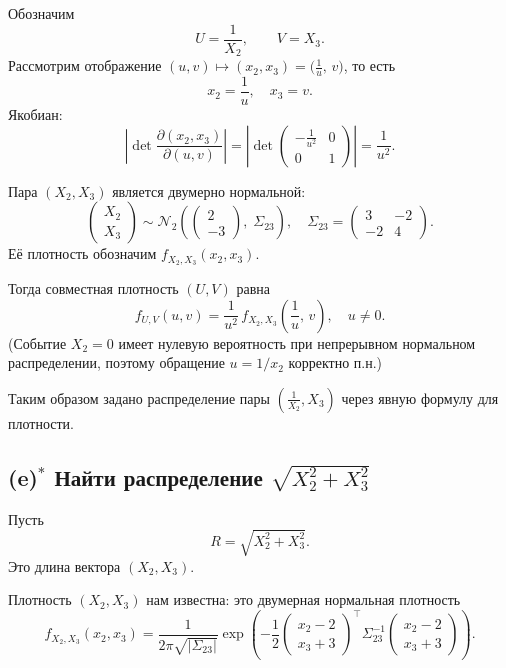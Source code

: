 \documentclass[12pt]{article}
\begin{document}
    Обозначим
    \[
        U = \frac{1}{X_2},\qquad V = X_3.
    \]
    Рассмотрим отображение $(u,v)\mapsto(x_2,x_3) = \bigl(\frac{1}{u},\,v\bigr)$, то есть
    \[
        x_2 = \frac{1}{u},\quad x_3 = v.
    \]
    Якобиан:
    \[
        \left|\det \frac{\partial(x_2,x_3)}{\partial(u,v)} \right|
        = \left|\det
              \begin{pmatrix}
                  -\frac{1}{u^2} & 0\\
                  0 & 1
              \end{pmatrix}
        \right|
        = \frac{1}{u^2}.
    \]

    Пара $(X_2,X_3)$ является двумерно нормальной:
    \[
        \begin{pmatrix}
            X_2\\ X_3
        \end{pmatrix}
        \sim
        \mathcal{N}_2\!\left(
                           \begin{pmatrix}
                               2\\ -3
                           \end{pmatrix},
                           \;
                           \Sigma_{23}
        \right),
        \quad
        \Sigma_{23} =
        \begin{pmatrix}
            3 & -2\\
            -2 & 4
        \end{pmatrix}.
    \]
    Её плотность обозначим $f_{X_2,X_3}(x_2,x_3)$.

    Тогда совместная плотность $(U,V)$ равна
    \[
        f_{U,V}(u,v)
        = \frac{1}{u^2}\,
        f_{X_2,X_3}\!\left(\frac{1}{u},\,v\right),
        \quad u\neq 0.
    \]
    (Событие $X_2=0$ имеет нулевую вероятность при непрерывном нормальном распределении, поэтому обращение $u=1/x_2$ корректно п.н.)

    Таким образом задано распределение пары $\left(\frac{1}{X_2}, X_3\right)$ через явную формулу для плотности.

    \subsection*{(e)$^\ast$ Найти распределение $\sqrt{X_2^2 + X_3^2}$}

    Пусть
    \[
        R = \sqrt{X_2^2 + X_3^2}.
    \]
    Это длина вектора $(X_2,X_3)$.

    Плотность $(X_2,X_3)$ нам известна: это двумерная нормальная плотность
    \[
        f_{X_2,X_3}(x_2,x_3)
        = \frac{1}{2\pi\sqrt{|\Sigma_{23}|}}
        \exp\!\left(
                  -\frac12
                  \begin{pmatrix}
                      x_2-2\\ x_3+3
                  \end{pmatrix}^{\!\top}
                  \Sigma_{23}^{-1}
                  \begin{pmatrix}
                      x_2-2\\ x_3+3
                  \end{pmatrix}
        \right).
    \]
\end{document}
